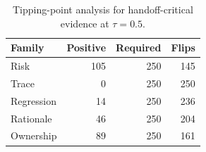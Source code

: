 \begin{table}[t]
\centering
\caption{Tipping-point analysis for handoff-critical evidence at $\tau=0.5$.}
\label{tab:tipping-point}
\footnotesize
\begin{tabular}{@{}L{0.31\columnwidth}rrr@{}}
\toprule
Family & Positive & Required & Flips \\
\midrule
Risk & 105 & 250 & 145 \\
Trace & 0 & 250 & 250 \\
Regression & 14 & 250 & 236 \\
Rationale & 46 & 250 & 204 \\
Ownership & 89 & 250 & 161 \\
\bottomrule
\end{tabular}
\end{table}
